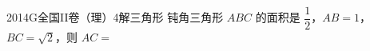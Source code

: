 
\begin{problem}{2014}{G}{全国II卷（理）}{4}{解三角形}
钝角三角形 $ ABC $ 的面积是 $ \dfrac{1}{2} $，$ AB=1 $，$ BC=\sqrt{2} $，则 $ AC= $
\begin{choices}
\end{choices}
\end{problem}

\begin{answer}

\end{answer}

\begin{solutions}

\end{solutions}